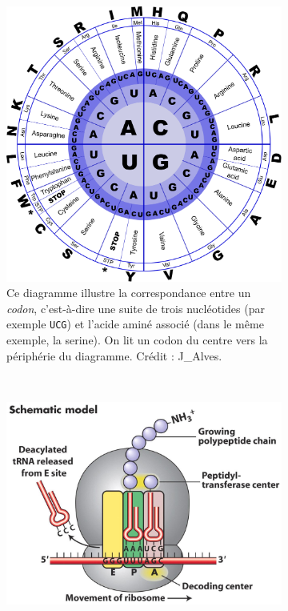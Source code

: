 \begin{appendices}
	\begin{figure}[htb]
		\begin{subfigure}[t]{0.44\textwidth}
			\centering
			\includegraphics[width=\textwidth]{figures/ch1/geneCode}
			\caption[Le code génétique]{Ce diagramme illustre la correspondance entre un \emph{codon}, c'est-à-dire une suite de trois nucléotides (par exemple \texttt{UCG}) et l'acide aminé associé (dans le même exemple, la serine). On lit un codon du centre vers la périphérie du diagramme. Crédit : J\_{}Alves\footnotemark{}.}
			\label{fig:geneCode}
		\end{subfigure}
		~
		\begin{subfigure}[t]{0.54\textwidth}
			\includegraphics[width=\textwidth]{figures/ch1/translation}

\end{subfigure}
\end{figure}
\end{appendices}
